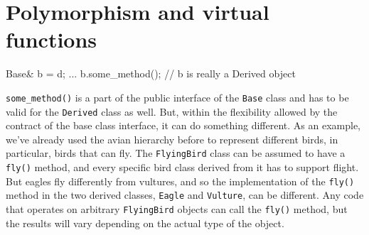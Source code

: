 
\section{Polymorphism and virtual functions}


\begin{code}
Base& b = d;
...
b.some_method(); // b is really a Derived object

\end{code}

\texttt{some\_method()} is a part of the public interface of the \texttt{Base} class and has to be valid for the \texttt{Derived} class as well. But, within the flexibility allowed by the contract of the base class interface, it can do something different. As an example, we've already used the avian hierarchy before to represent different birds, in particular, birds that can fly. The \texttt{FlyingBird} class can be assumed to have a \texttt{fly()} method, and every specific bird class derived from it has to support flight. But eagles fly differently from vultures, and so the implementation of the \texttt{fly()} method in the two derived classes, \texttt{Eagle} and \texttt{Vulture}, can be different. Any code that operates on arbitrary \texttt{FlyingBird} objects can call the \texttt{fly()} method, but the results will vary depending on the actual type of the object.


